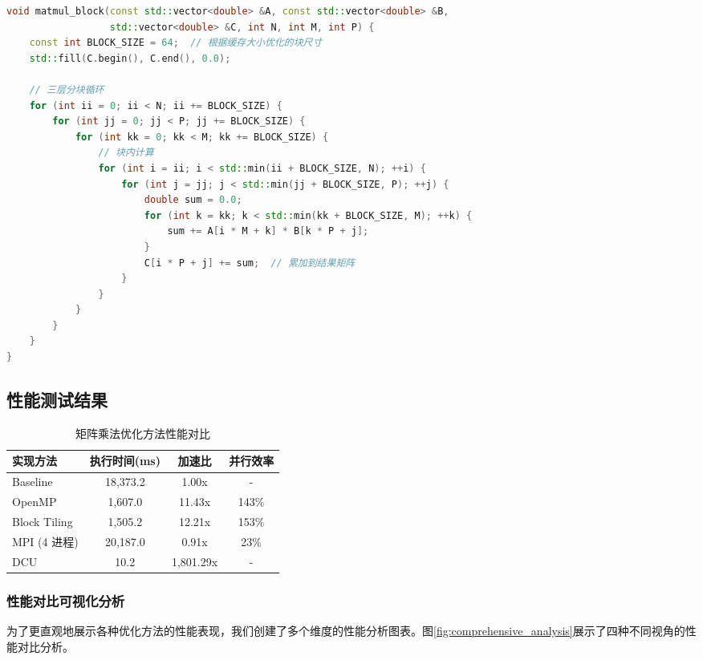 \documentclass[a4paper]{article}
\begin{document}
\begin{lstlisting}[language=C++]
void matmul_block(const std::vector<double> &A, const std::vector<double> &B,
                  std::vector<double> &C, int N, int M, int P) {
    const int BLOCK_SIZE = 64;  // 根据缓存大小优化的块尺寸
    std::fill(C.begin(), C.end(), 0.0);

    // 三层分块循环
    for (int ii = 0; ii < N; ii += BLOCK_SIZE) {
        for (int jj = 0; jj < P; jj += BLOCK_SIZE) {
            for (int kk = 0; kk < M; kk += BLOCK_SIZE) {
                // 块内计算
                for (int i = ii; i < std::min(ii + BLOCK_SIZE, N); ++i) {
                    for (int j = jj; j < std::min(jj + BLOCK_SIZE, P); ++j) {
                        double sum = 0.0;
                        for (int k = kk; k < std::min(kk + BLOCK_SIZE, M); ++k) {
                            sum += A[i * M + k] * B[k * P + j];
                        }
                        C[i * P + j] += sum;  // 累加到结果矩阵
                    }
                }
            }
        }
    }
}
\end{lstlisting}

\subsection{性能测试结果}

\begin{table}[h]
\centering
\begin{tabular}{@{}lccc@{}}
\toprule
实现方法 & 执行时间(ms) & 加速比 & 并行效率 \\
\midrule
Baseline & 18,373.2 & 1.00x & - \\
OpenMP & 1,607.0 & 11.43x & 143\% \\
Block Tiling & 1,505.2 & 12.21x & 153\% \\
MPI (4 进程) & 20,187.0 & 0.91x & 23\% \\
DCU & 10.2 & 1,801.29x & - \\
\bottomrule
\end{tabular}
\caption{矩阵乘法优化方法性能对比}
\end{table}

\subsubsection{性能对比可视化分析}

为了更直观地展示各种优化方法的性能表现，我们创建了多个维度的性能分析图表。图\ref{fig:comprehensive_analysis}展示了四种不同视角的性能对比分析。
\end{document}
